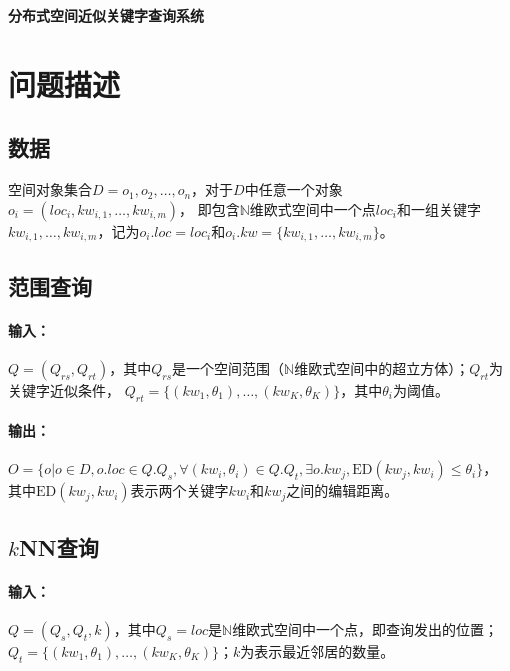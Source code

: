 \documentclass{ML}
\begin{document}
\maketitle

\tableofcontents
\newpage

\begin{center}
    \textbf{ 分布式空间近似关键字查询系统}
\end{center}

\section{问题描述}
\subsection{数据}
空间对象集合$D = {o_1, o_2, \dots, o_n}$，对于$D$中任意一个对象$o_i = (loc_i, kw_{i, 1}, \dots, kw_{i, m})$，
即包含$\mathbb{N}$维欧式空间中一个点$loc_i$和一组关键字$kw_{i, 1}, \dots, kw_{i, m}$，记为$o_i.loc = loc_i$和$o_i.kw = \{kw_{i, 1}, \dots, kw_{i, m}\}$。

\subsection{范围查询}
\paragraph{输入：}$Q = (Q_{rs}, Q_{rt})$，其中$Q_{rs}$是一个空间范围（$\mathbb{N}$维欧式空间中的超立方体）；$Q_{rt}$为关键字近似条件，
$Q_{rt} = \{(kw_1, \theta_1), \dots, (kw_K, \theta_K)\}$，其中$\theta_i$为阈值。
\paragraph{输出：}$O = \{o | o \in D, o.loc \in Q.Q_s, \forall(kw_i, \theta_i) \in Q.Q_t, \exists o.kw_j, \mathrm{ED}(kw_j, kw_i) \leq \theta_i\}$，
其中$\mathrm{ED}(kw_j, kw_i)$表示两个关键字$kw_i$和$kw_j$之间的编辑距离。

\subsection{$k$NN查询}\label{sec:knn_query}
\paragraph{输入：} $Q = (Q_s, Q_t, k)$，其中$Q_s = loc$是$\mathbb{N}$维欧式空间中一个点，即查询发出的位置；
$Q_t = \{(kw_1, \theta_1), \dots, (kw_K, \theta_K)\}$；$k$为表示最近邻居的数量。
\end{document}
